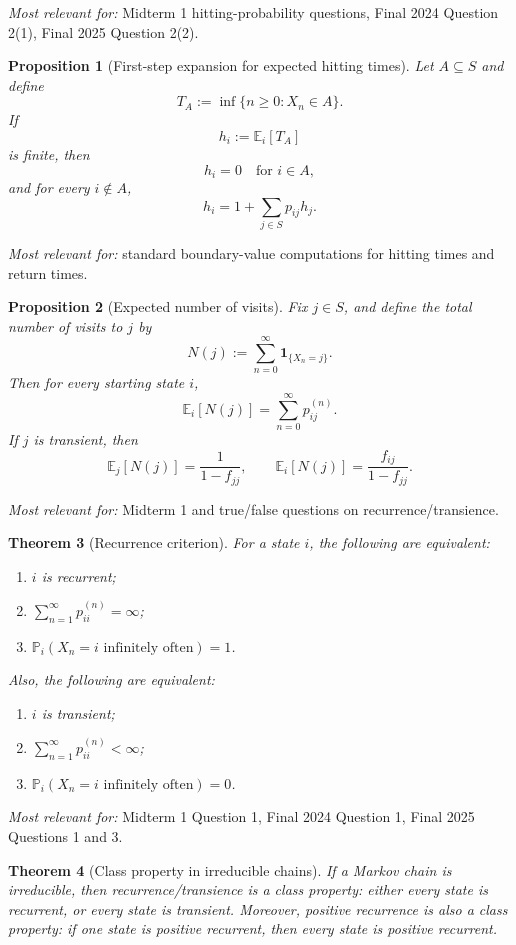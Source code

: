 \documentclass[11pt]{article}
\newtheorem{theorem}{Theorem}[section]
\newtheorem{proposition}[theorem]{Proposition}
\theoremstyle{definition}
\begin{document}
\emph{Most relevant for:} Midterm 1 hitting-probability questions, Final 2024 Question 2(1), Final 2025 Question 2(2).

\begin{proposition}[First-step expansion for expected hitting times]
Let $A\subseteq S$ and define
\[
T_A:=\inf\{n\ge 0:X_n\in A\}.
\]
If
\[
h_i:=\mathbb E_i[T_A]
\]
is finite, then
\[
h_i=0 \quad \text{for } i\in A,
\]
and for every $i\notin A$,
\[
h_i = 1 + \sum_{j\in S} p_{ij} h_j.
\]
\end{proposition}

\emph{Most relevant for:} standard boundary-value computations for hitting times and return times.

\begin{proposition}[Expected number of visits]
Fix $j\in S$, and define the total number of visits to $j$ by
\[
N(j):=\sum_{n=0}^{\infty} \mathbf 1_{\{X_n=j\}}.
\]
Then for every starting state $i$,
\[
\mathbb E_i[N(j)] = \sum_{n=0}^{\infty} p_{ij}^{(n)}.
\]
If $j$ is transient, then
\[
\mathbb E_j[N(j)] = \frac{1}{1-f_{jj}},
\qquad
\mathbb E_i[N(j)] = \frac{f_{ij}}{1-f_{jj}}.
\]
\end{proposition}

\emph{Most relevant for:} Midterm 1 and true/false questions on recurrence/transience.

\begin{theorem}[Recurrence criterion]
For a state $i$, the following are equivalent:
\begin{enumerate}[label=(\roman*)]
    \item $i$ is recurrent;
    \item $\sum_{n=1}^{\infty} p_{ii}^{(n)} = \infty$;
    \item $\mathbb P_i(X_n=i \text{ infinitely often}) = 1$.
\end{enumerate}
Also, the following are equivalent:
\begin{enumerate}[label=(\roman*)]
    \item $i$ is transient;
    \item $\sum_{n=1}^{\infty} p_{ii}^{(n)} < \infty$;
    \item $\mathbb P_i(X_n=i \text{ infinitely often}) = 0$.
\end{enumerate}
\end{theorem}

\emph{Most relevant for:} Midterm 1 Question 1, Final 2024 Question 1, Final 2025 Questions 1 and 3.

\begin{theorem}[Class property in irreducible chains]
If a Markov chain is irreducible, then recurrence/transience is a class property: either every state is recurrent, or every state is transient. Moreover, positive recurrence is also a class property: if one state is positive recurrent, then every state is positive recurrent.
\end{theorem}
\end{document}
